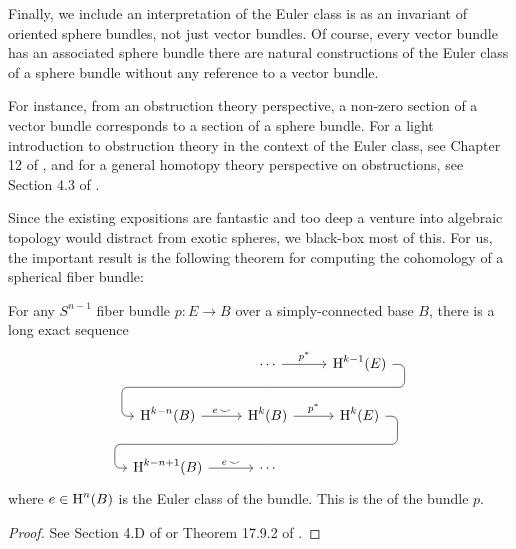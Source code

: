 Finally, we include an interpretation of the Euler class is as an invariant of oriented sphere bundles, not just vector bundles. Of course, every vector bundle has an associated sphere bundle there are natural constructions of the Euler class of a sphere bundle without any reference to a vector bundle. 

For instance, from an obstruction theory perspective, a non-zero section of a vector bundle corresponds to a section of a sphere bundle. For a light introduction to obstruction theory in the context of the Euler class, see Chapter 12 of \cite{milnorstasheff1974}, and for a general homotopy theory perspective on obstructions, see Section 4.3 of \cite{hatcher2002topology}.

Since the existing expositions are fantastic and too deep a venture into algebraic topology would distract from exotic spheres, we black-box most of this. For us, the important result is the following theorem for computing the cohomology of a spherical fiber bundle:

\begin{theorem}\label{thm:gysin-sequence}
	For any $S^{n-1}$ fiber bundle  $p: E\to B$ over a simply-connected base $B$,
	there is a long exact sequence 
\[
	\begin{tikzcd}
	  & \cdots\rar{p^*} \snakenode{X} & \H^{k-1}(E)\snakearrow{X} \\
		{\H^{k-n}(B)}\rar{e\,\smile} & {\H^k(B)}\rar{p^*}\snakenode{Y} & {\H^k(E)}\snakearrow{Y} \\
		{\H^{k-n+1}(B)}\rar{e\,\smile} & \cdots
\end{tikzcd}
\]
	where $e\in \operatorname{H}^n(B)$ is the Euler class of the bundle. 
	This is the  of the bundle $p$.
\end{theorem}
\begin{proof}
	See Section 4.D of \cite{hatcher2002topology} or Theorem 17.9.2 of \cite{dieck2008algebraic}.
\end{proof}
